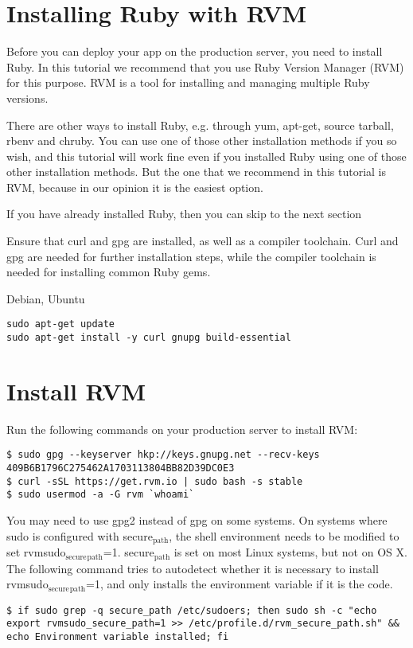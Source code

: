 \documentclass[11pt]{article}
\author{Justin}
\date{\today}
\title{}
\begin{document}
\tableofcontents

\section{Installing Ruby with RVM}
\label{sec:org63fd323}
Before you can deploy your app on the production server, you need to install Ruby. In this tutorial we recommend that you use Ruby Version Manager (RVM) for this purpose. RVM is a tool for installing and managing multiple Ruby versions.

There are other ways to install Ruby, e.g. through yum, apt-get, source tarball, rbenv and chruby. You can use one of those other installation methods if you so wish, and this tutorial will work fine even if you installed Ruby using one of those other installation methods. But the one that we recommend in this tutorial is RVM, because in our opinion it is the easiest option.

If you have already installed Ruby, then you can skip to the next section

Ensure that curl and gpg are installed, as well as a compiler toolchain. Curl and gpg are needed for further installation steps, while the compiler toolchain is needed for installing common Ruby gems.

Debian, Ubuntu	
\begin{verbatim}
sudo apt-get update
sudo apt-get install -y curl gnupg build-essential
\end{verbatim}
\section{Install RVM}
\label{sec:orgf1c8aab}

Run the following commands on your production server to install RVM:

\begin{verbatim}
$ sudo gpg --keyserver hkp://keys.gnupg.net --recv-keys 409B6B1796C275462A1703113804BB82D39DC0E3
$ curl -sSL https://get.rvm.io | sudo bash -s stable
$ sudo usermod -a -G rvm `whoami`
\end{verbatim}

You may need to use gpg2 instead of gpg on some systems.
On systems where sudo is configured with secure\(_{\text{path}}\), the shell environment needs to be modified to set rvmsudo\(_{\text{secure}}\)\(_{\text{path}}\)=1. secure\(_{\text{path}}\) is set on most Linux systems, but not on OS X. The following command tries to autodetect whether it is necessary to install rvmsudo\(_{\text{secure}}\)\(_{\text{path}}\)=1, and only installs the environment variable if it is the code.
\begin{verbatim}
$ if sudo grep -q secure_path /etc/sudoers; then sudo sh -c "echo export rvmsudo_secure_path=1 >> /etc/profile.d/rvm_secure_path.sh" && echo Environment variable installed; fi
\end{verbatim}
\end{document}
